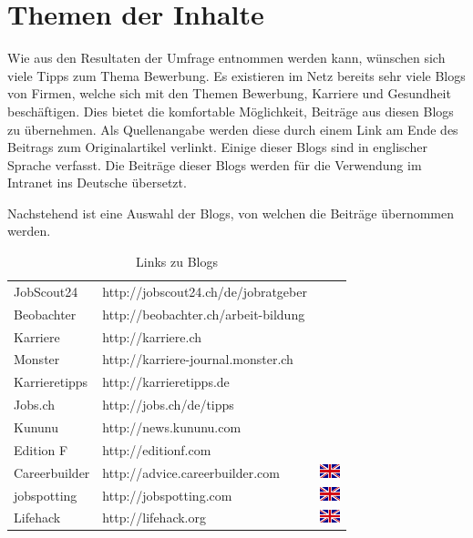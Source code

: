 \documentclass[a4paper,11pt,twoside,titlepage,openright]{report}
\numberwithin{equation}{section}		%
\numberwithin{figure}{section}			%
\numberwithin{table}{section}				%
\begin{document}
\section{Themen der Inhalte}

Wie aus den Resultaten der Umfrage entnommen werden kann, wünschen sich viele Tipps zum Thema Bewerbung. Es existieren im Netz bereits sehr viele Blogs von Firmen, welche sich mit den Themen Bewerbung, Karriere und Gesundheit beschäftigen. Dies bietet die komfortable Möglichkeit, Beiträge aus diesen Blogs zu übernehmen. Als Quellenangabe werden diese durch einem Link am Ende des Beitrags zum Originalartikel verlinkt. Einige dieser Blogs sind in englischer Sprache verfasst. Die Beiträge dieser Blogs werden für die Verwendung im Intranet ins Deutsche übersetzt.

Nachstehend ist eine Auswahl der Blogs, von welchen die Beiträge übernommen werden.

\begin{table}[H]
\centering
\begin{tabular}{ l l l }
JobScout24    	& http://jobscout24.ch/de/jobratgeber	&\\
Beobachter		& http://beobachter.ch/arbeit-bildung	&\\
Karriere        & http://karriere.ch					&\\
Monster         & http://karriere-journal.monster.ch	&\\
Karrieretipps   & http://karrieretipps.de				&\\
Jobs.ch         & http://jobs.ch/de/tipps				&\\
Kununu          & http://news.kununu.com				&\\
Edition F		& http://editionf.com					&\\
Careerbuilder   & http://advice.careerbuilder.com		& \includegraphics[width=22px]{Images/en_GB.png}\\
jobspotting		& http://jobspotting.com				& \includegraphics[width=22px]{Images/en_GB.png}\\
Lifehack		& http://lifehack.org					& \includegraphics[width=22px]{Images/en_GB.png} 
\end{tabular}
\caption{Links zu Blogs}
\end{table}
\end{document}
